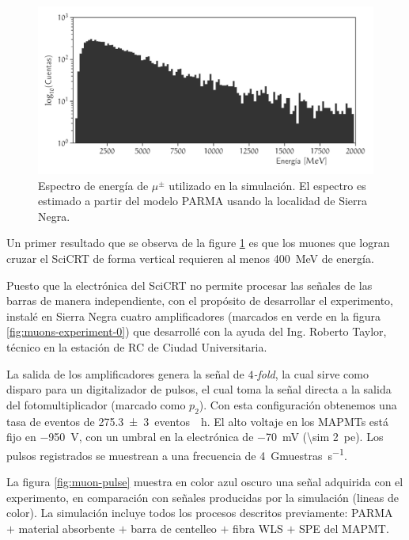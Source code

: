 \begin{figure}
        \centering
        \includegraphics[width=\textwidth]{scibar-edep.pdf}
        \caption{Espectro de energía de $\mu^{\pm}$ utilizado en la simulación. El espectro es estimado a partir del modelo PARMA usando la localidad de Sierra Negra.}
        \label{fig:muons-spectrum}
\end{figure}

Un primer resultado que se observa de la figure \ref{fig:muons-spectrum} es que los muones que logran cruzar el SciCRT de forma vertical requieren al menos \SI{400}{\mega\electronvolt} de energía.

Puesto que la electrónica del SciCRT no permite procesar las señales de las barras de manera independiente, con el propósito de desarrollar el experimento, instalé en Sierra Negra cuatro amplificadores (marcados en verde en la figura \ref{fig:muons-experiment-0}) que desarrollé con la ayuda del Ing. Roberto Taylor, técnico en la estación de RC de Ciudad Universitaria.

La salida de los amplificadores genera la señal de \emph{$4$-fold}, la cual sirve como disparo para un digitalizador de pulsos, el cual toma la señal directa a la salida del fotomultiplicador (marcado como $p_{2}$). Con esta configuración obtenemos una tasa de eventos de \SI{275.3(30)}{eventos \per\hour}. El alto voltaje en los MAPMTs está fijo en \SI{-950}{\volt}, con un umbral en la electrónica de \SI{-70}{\milli\volt} (\SI{\sim 2}{pe}). Los pulsos registrados se muestrean a una frecuencia de \SI{4}{\giga muestras\per\second}.

La figura \ref{fig:muon-pulse} muestra en color azul oscuro una señal adquirida con el experimento, en comparación con señales producidas por la simulación (lineas de color). La simulación incluye todos los procesos descritos previamente: PARMA $+$ material absorbente $+$ barra de centelleo $+$ fibra WLS $+$ SPE del MAPMT.

